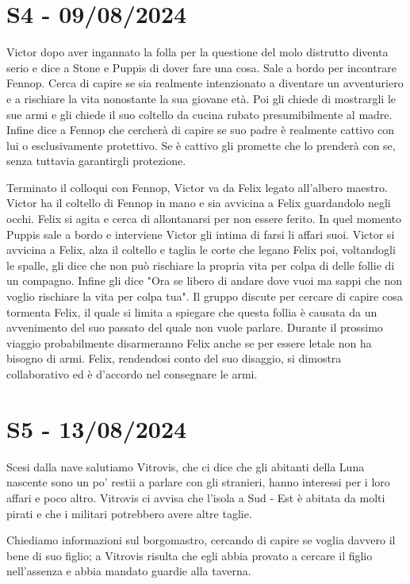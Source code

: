 \documentclass[letterpaper,twocolumn,openany, nodeprecatedcode, nomultitoc]{dndbook}
\begin{document}
\section{S4 - 09/08/2024}
Victor dopo aver ingannato la folla per la questione del molo distrutto diventa serio e dice a Stone e Puppis di dover fare una cosa. Sale a bordo per incontrare Fennop. Cerca di capire se sia realmente intenzionato a diventare un avventuriero e a rischiare la vita nonostante la sua giovane età. Poi gli chiede di mostrargli le sue armi e gli chiede il suo coltello da cucina rubato presumibilmente al madre. Infine dice a Fennop che cercherà di capire se suo padre è realmente cattivo con lui o esclusivamente protettivo. Se è cattivo gli promette che lo prenderà con se, senza tuttavia garantirgli protezione.

Terminato il colloqui con Fennop, Victor va da Felix legato all'albero maestro. Victor ha il coltello di Fennop in mano e sia avvicina a Felix guardandolo negli occhi. Felix si agita e cerca di allontanarsi per non essere ferito. In quel momento Puppis sale a bordo e interviene Victor gli intima di farsi li affari suoi. Victor si avvicina a Felix, alza il coltello e taglia le corte che legano Felix poi, voltandogli le spalle, gli dice che non può rischiare la propria vita per colpa di delle follie di un compagno. Infine gli dice "Ora se libero di andare dove vuoi ma sappi che non voglio rischiare la vita per colpa tua". Il gruppo discute per cercare di capire cosa tormenta Felix, il quale si limita a spiegare che questa follia è causata da un avvenimento del suo passato del quale non vuole parlare. Durante il prossimo viaggio probabilmente disarmeranno Felix anche se per essere letale non ha bisogno di armi. Felix, rendendosi conto del suo disaggio, si dimostra collaborativo ed è d'accordo nel consegnare le armi.

\section{S5 - 13/08/2024}
Scesi dalla nave salutiamo Vitrovis, che ci dice che gli abitanti della Luna nascente sono un po' restii a parlare con gli stranieri, hanno interessi per i loro affari e poco altro. Vitrovis ci avvisa che l'isola a Sud - Est è abitata da molti pirati e che i militari potrebbero avere altre taglie.

Chiediamo informazioni sul borgomastro, cercando di capire se voglia davvero il bene di suo figlio; a Vitrovis risulta che egli abbia provato a cercare il figlio nell'assenza e abbia mandato guardie alla taverna.
\end{document}
